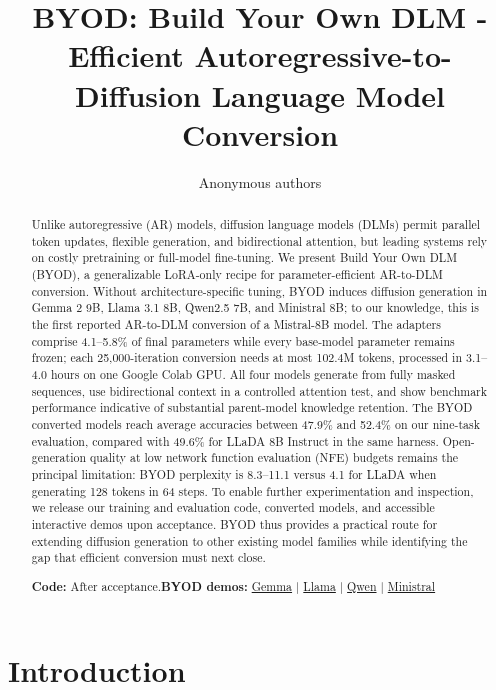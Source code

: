 \documentclass{article}
\title{BYOD: Build Your Own DLM - Efficient Autoregressive-to-Diffusion Language Model Conversion}
\author{Anonymous authors}
\begin{document}
\maketitle

\begin{abstract}
Unlike autoregressive (AR) models, diffusion language models (DLMs) permit parallel token updates, flexible generation, and bidirectional attention, but leading systems rely on costly pretraining or full-model fine-tuning. We present Build Your Own DLM (BYOD), a generalizable LoRA-only recipe for parameter-efficient AR-to-DLM conversion. Without architecture-specific tuning, BYOD induces diffusion generation in Gemma 2 9B, Llama 3.1 8B, Qwen2.5 7B, and Ministral 8B; to our knowledge, this is the first reported AR-to-DLM conversion of a Mistral-8B model. The adapters comprise 4.1--5.8\% of final parameters while every base-model parameter remains frozen; each 25,000-iteration conversion needs at most 102.4M tokens, processed in 3.1--4.0 hours on one Google Colab GPU. All four models generate from fully masked sequences, use bidirectional context in a controlled attention test, and show benchmark performance indicative of substantial parent-model knowledge retention. The BYOD converted models reach average accuracies between 47.9\% and 52.4\% on our nine-task evaluation, compared with 49.6\% for LLaDA 8B Instruct in the same harness. Open-generation quality at low network function evaluation (NFE) budgets remains the principal limitation: BYOD perplexity is 8.3--11.1 versus 4.1 for LLaDA when generating 128 tokens in 64 steps. To enable further experimentation and inspection, we release our training and evaluation code, converted models, and accessible interactive demos upon acceptance. BYOD thus provides a practical route for extending diffusion generation to other existing model families while identifying the gap that efficient conversion must next close.

\noindent\textbf{Code:} After acceptance.\quad\textbf{BYOD demos:}
\href{https://huggingface.co/spaces/Dovelove/byod-gemma-2-9b}{Gemma} $\mid$
\href{https://huggingface.co/spaces/Dovelove/byod-llama-3.1-8b}{Llama} $\mid$
\href{https://huggingface.co/spaces/Dovelove/byod-qwen2.5-7b}{Qwen} $\mid$
\href{https://huggingface.co/spaces/Dovelove/byod-ministral-8b}{Ministral}
\end{abstract}

\section{Introduction}
\end{document}
